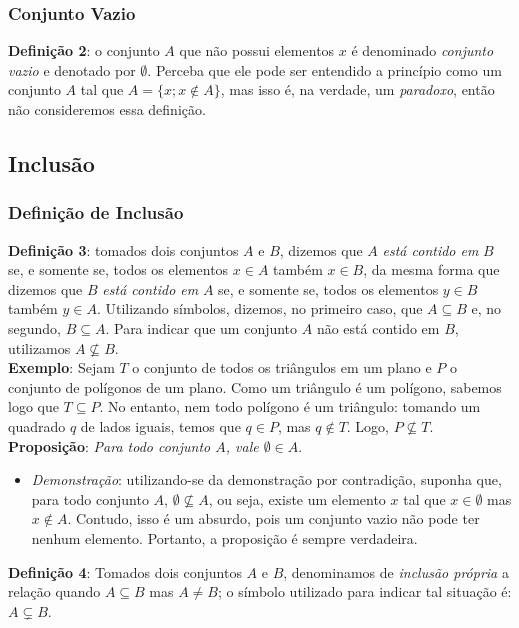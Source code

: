 \documentclass{article}
\begin{document}
\subsubsection{Conjunto Vazio}
\textbf{Definição 2}: o conjunto $A$ que não possui elementos $x$ é denominado \emph{conjunto vazio} e denotado por $\emptyset$. Perceba que ele pode ser entendido a princípio como um conjunto $A$ tal que $A = \{x; x \notin A\}$, mas isso é, na verdade, um \emph{paradoxo}, então não consideremos essa definição.

\subsection{Inclusão}
\subsubsection{Definição de Inclusão}
\textbf{Definição 3}: tomados dois conjuntos $A$ e $B$, dizemos que $A$ \emph{está contido em} $B$ se, e somente se, todos os elementos $x \in A$ também $x \in B$, da mesma forma que dizemos que $B$ \emph{está contido em} $A$ se, e somente se, todos os elementos $y \in B$ também $y \in A$. Utilizando símbolos, dizemos, no primeiro caso, que $A \subseteq B$ e, no segundo, $B \subseteq A$. Para indicar que um conjunto $A$ não está contido em $B$, utilizamos $ A \nsubseteq B$. \\
\textbf{Exemplo}: Sejam $T$ o conjunto de todos os triângulos em um plano e $P$ o conjunto de polígonos de um plano. Como um triângulo é um polígono, sabemos logo que $T \subseteq P$. No entanto, nem todo polígono é um triângulo: tomando um quadrado $q$ de lados iguais, temos que $q \in P$, mas $q \notin T$. Logo, $P \nsubseteq T$. \\
\textbf{Proposição}: \emph{Para todo conjunto $A$, vale $\emptyset \in A$}.
\begin{itemize}
    \item \emph{Demonstração}: utilizando-se da demonstração por contradição, suponha que, para todo conjunto $A$, $\emptyset \nsubseteq A$, ou seja, existe um elemento $x$ tal que $x \in \emptyset$ mas $x \notin A$. Contudo, isso é um absurdo, pois um conjunto vazio não pode ter nenhum elemento. Portanto, a proposição é sempre verdadeira.
\end{itemize}
\textbf{Definição 4}: Tomados dois conjuntos $A$ e $B$, denominamos de \emph{inclusão própria} a relação quando $A \subseteq B$ mas $A \ne B$; o símbolo utilizado para indicar tal situação é: $A \subsetneq B$. \\
\end{document}
